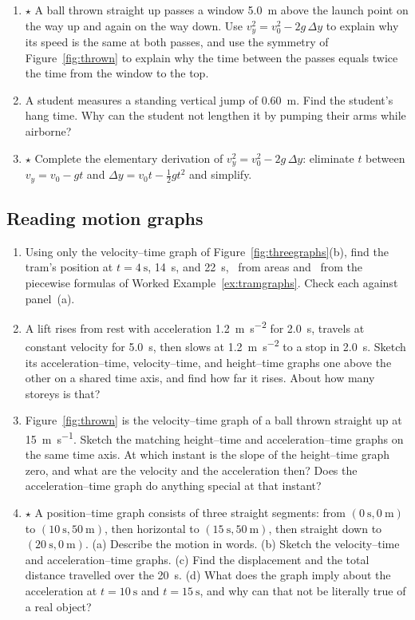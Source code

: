 \documentclass[11pt,twoside,openany]{book}
\newcommand{\viewtag}[3]{\fcolorbox{#2}{#3}{\footnotesize\textbf{\textcolor{#2}{#1}}}}
\newcommand{\elemtag}{\viewtag{Elementary}{elemcol}{elempale}}
\newcommand{\calctag}{\viewtag{Calculus}{calccol}{calcpale}}
\begin{document}
\begin{enumerate}[label=\textbf{\thechapter.\arabic*},resume=exercises,leftmargin=*]
  \item $\star$ A ball thrown straight up passes a window \SI{5.0}{\metre} above the launch point on the way up and again on the way down. Use $v_y^2 = v_0^2 - 2g\,\Delta y$ to explain why its speed is the same at both passes, and use the symmetry of Figure~\ref{fig:thrown} to explain why the time between the passes equals twice the time from the window to the top.
  \item A student measures a standing vertical jump of \SI{0.60}{\metre}. Find the student's hang time. Why can the student not lengthen it by pumping their arms while airborne?
  \item $\star$ Complete the elementary derivation of $v_y^2 = v_0^2 - 2g\,\Delta y$: eliminate $t$ between $v_y = v_0 - gt$ and $\Delta y = v_0 t - \tfrac12 g t^2$ and simplify.\label{ex:elimt}
\end{enumerate}

\subsection*{Reading motion graphs}
\begin{enumerate}[label=\textbf{\thechapter.\arabic*},resume=exercises,leftmargin=*]
  \item Using only the velocity--time graph of Figure~\ref{fig:threegraphs}(b), find the tram's position at $t = \SI{4}{\second}$, \SI{14}{\second}, and \SI{22}{\second}, \elemtag\ from areas and \calctag\ from the piecewise formulas of Worked Example~\ref{ex:tramgraphs}. Check each against panel~(a).
  \item A lift rises from rest with acceleration \SI{1.2}{\metre\per\second\squared} for \SI{2.0}{\second}, travels at constant velocity for \SI{5.0}{\second}, then slows at \SI{1.2}{\metre\per\second\squared} to a stop in \SI{2.0}{\second}. Sketch its acceleration--time, velocity--time, and height--time graphs one above the other on a shared time axis, and find how far it rises. About how many storeys is that?
  \item Figure~\ref{fig:thrown} is the velocity--time graph of a ball thrown straight up at \SI{15}{\metre\per\second}. Sketch the matching height--time and acceleration--time graphs on the same time axis. At which instant is the slope of the height--time graph zero, and what are the velocity and the acceleration then? Does the acceleration--time graph do anything special at that instant?
  \item $\star$ A position--time graph consists of three straight segments: from $(\SI{0}{\second}, \SI{0}{\metre})$ to $(\SI{10}{\second}, \SI{50}{\metre})$, then horizontal to $(\SI{15}{\second}, \SI{50}{\metre})$, then straight down to $(\SI{20}{\second}, \SI{0}{\metre})$. (a) Describe the motion in words. (b) Sketch the velocity--time and acceleration--time graphs. (c) Find the displacement and the total distance travelled over the \SI{20}{\second}. (d) What does the graph imply about the acceleration at $t = \SI{10}{\second}$ and $t = \SI{15}{\second}$, and why can that not be literally true of a real object?
\end{enumerate}
\end{document}
